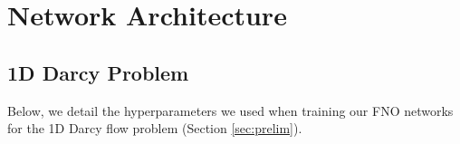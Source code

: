
\chapter{Network Architecture}
\section{1D Darcy Problem}
Below, we detail the hyperparameters we used when training our FNO networks for the 1D Darcy flow problem (Section \ref{sec:prelim}).